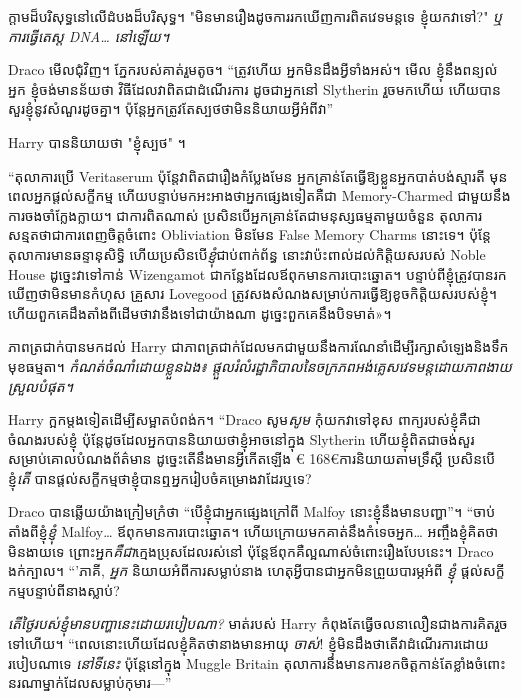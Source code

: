 ក្តាមដ៏បរិសុទ្ធនៅលើដំបងដ៏បរិសុទ្ធ។ "មិនមានរឿងដូចការរកឃើញការពិតវេទមន្តទេ ខ្ញុំយកវាទៅ?" \emph{ឬការធ្វើតេស្ត DNA… នៅឡើយ។}

Draco មើលជុំវិញ។ ភ្នែករបស់គាត់រួមតូច។ “ត្រូវហើយ អ្នកមិនដឹងអ្វីទាំងអស់។ មើល ខ្ញុំនឹងពន្យល់អ្នក ខ្ញុំចង់មានន័យថា វិធីដែលវាពិតជាដំណើរការ ដូចជាអ្នកនៅ Slytherin រួចមកហើយ ហើយបានសួរខ្ញុំនូវសំណួរដូចគ្នា។ ប៉ុន្តែអ្នកត្រូវតែស្បថថាមិននិយាយអ្វីអំពីវា”

Harry បាននិយាយថា "ខ្ញុំស្បថ" ។

“តុលាការប្រើ Veritaserum ប៉ុន្តែវាពិតជារឿងកំប្លែងមែន អ្នកគ្រាន់តែធ្វើឱ្យខ្លួនអ្នកបាត់បង់ស្មារតី មុនពេលអ្នកផ្តល់សក្ខីកម្ម ហើយបន្ទាប់មកអះអាងថាអ្នកផ្សេងទៀតគឺជា Memory-Charmed ជាមួយនឹងការចងចាំក្លែងក្លាយ។ ជាការពិតណាស់ ប្រសិនបើអ្នកគ្រាន់តែជាមនុស្សធម្មតាមួយចំនួន តុលាការសន្មតថាជាការពេញចិត្តចំពោះ Obliviation មិនមែន False Memory Charms នោះទេ។ ប៉ុន្តែតុលាការមានឆន្ទានុសិទ្ធិ ហើយប្រសិនបើ\emph{ខ្ញុំ}ជាប់ពាក់ព័ន្ធ នោះវាប៉ះពាល់ដល់កិត្តិយសរបស់ Noble House ដូច្នេះវាទៅកាន់ Wizengamot ជាកន្លែងដែលឪពុកមានការបោះឆ្នោត។ បន្ទាប់​ពី​ខ្ញុំ​ត្រូវ​បាន​រក​ឃើញ​ថា​មិន​មាន​កំហុស គ្រួសារ Lovegood ត្រូវ​សង​សំណង​សម្រាប់​ការ​ធ្វើ​ឱ្យ​ខូច​កិត្តិយស​របស់​ខ្ញុំ។ ហើយ​ពួក​គេ​ដឹង​តាំង​ពី​ដើម​ថា​វា​នឹង​ទៅ​ជា​យ៉ាង​ណា ដូច្នេះ​ពួក​គេ​នឹង​បិទ​មាត់»។

ភាព​ត្រជាក់​បាន​មក​ដល់ Harry ជា​ភាព​ត្រជាក់​ដែល​មក​ជាមួយ​នឹង​ការ​ណែនាំ​ដើម្បី​រក្សា​សំឡេង​និង​ទឹក​មុខ​ធម្មតា។ \emph{កំណត់ចំណាំដោយខ្លួនឯង៖ ផ្តួលរំលំរដ្ឋាភិបាលនៃចក្រភពអង់គ្លេសវេទមន្តដោយភាពងាយស្រួលបំផុត។}

Harry ក្អកម្តងទៀតដើម្បីសម្អាតបំពង់ក។ “Draco សូម\emph{សូម} កុំយកវាទៅខុស ពាក្យរបស់ខ្ញុំគឺជាចំណងរបស់ខ្ញុំ ប៉ុន្តែដូចដែលអ្នកបាននិយាយថាខ្ញុំអាចនៅក្នុង Slytherin ហើយខ្ញុំពិតជាចង់សួរសម្រាប់គោលបំណងព័ត៌មាន ដូច្នេះតើនឹងមានអ្វីកើតឡើង € 168€{ការនិយាយតាមទ្រឹស្តី} ប្រសិនបើខ្ញុំ\emph{តើ} បានផ្តល់សក្ខីកម្មថាខ្ញុំបានឮអ្នករៀបចំគម្រោងវាដែរឬទេ?

Draco បាន​ឆ្លើយ​យ៉ាង​ក្រៀមក្រំ​ថា “បើ​ខ្ញុំ​ជា​អ្នក​ផ្សេង​ក្រៅ​ពី Malfoy នោះ​ខ្ញុំ​នឹង​មាន​បញ្ហា”។ “ចាប់តាំងពីខ្ញុំ\emph{ខ្ញុំ} Malfoy… ឪពុកមានការបោះឆ្នោត។ ហើយក្រោយមកគាត់នឹងកំទេចអ្នក… អញ្ចឹងខ្ញុំគិតថាមិនងាយទេ ព្រោះអ្នក\emph{គឺជា}ក្មេងប្រុសដែលរស់នៅ ប៉ុន្តែឪពុកគឺល្អណាស់ចំពោះរឿងបែបនេះ។ Draco ងក់ក្បាល។ “'ភាគី, \emph{អ្នក} និយាយអំពីការសម្លាប់នាង ហេតុអ្វីបានជាអ្នកមិនព្រួយបារម្ភអំពី \emph{ខ្ញុំ} ផ្តល់សក្ខីកម្មបន្ទាប់ពីនាងស្លាប់?

\emph{តើថ្ងៃរបស់ខ្ញុំមានបញ្ហានេះដោយរបៀបណា?} មាត់របស់ Harry កំពុងតែធ្វើចលនាលឿនជាងការគិតរួចទៅហើយ។ “ពេលនោះហើយដែលខ្ញុំគិតថានាងមានអាយុ \emph{ចាស់}! ខ្ញុំមិនដឹងថាតើវាដំណើរការដោយរបៀបណាទេ \emph{នៅទីនេះ} ប៉ុន្តែនៅក្នុង Muggle Britain តុលាការនឹងមានការខកចិត្តកាន់តែខ្លាំងចំពោះនរណាម្នាក់ដែលសម្លាប់កុមារ—”

